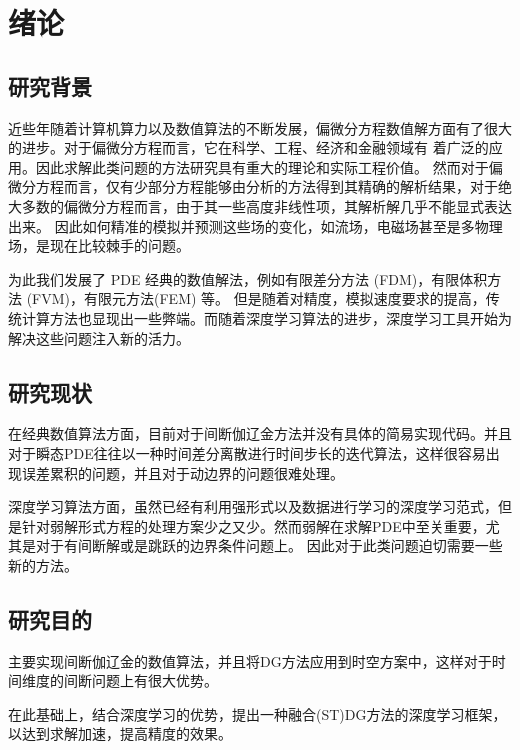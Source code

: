 \cleardoublepage

\chapter{绪论}

\section{研究背景}
近些年随着计算机算力以及数值算法的不断发展，偏微分方程数值解方面有了很大的进步。对于偏微分方程而言，它在科学、工程、经济和金融领域有
着广泛的应用。因此求解此类问题的方法研究具有重大的理论和实际工程价值。
然而对于偏微分方程而言，仅有少部分方程能够由分析的方法得到其精确的解析结果，对于绝大多数的偏微分方程而言，由于其一些高度非线性项，其解析解几乎不能显式表达出来。
因此如何精准的模拟并预测这些场的变化，如流场，电磁场甚至是多物理场，是现在比较棘手的问题。

为此我们发展了 PDE 经典的数值解法，例如有限差分方法 (FDM)，有限体积方法 (FVM)，有限元方法(FEM) 等。
但是随着对精度，模拟速度要求的提高，传统计算方法也显现出一些弊端。而随着深度学习算法的进步，深度学习工具开始为解决这些问题注入新的活力。

\section{研究现状}
在经典数值算法方面，目前对于间断伽辽金方法并没有具体的简易实现代码。并且对于瞬态PDE往往以一种时间差分离散进行时间步长的迭代算法，这样很容易出现误差累积的问题，并且对于动边界的问题很难处理。

深度学习算法方面，虽然已经有利用强形式以及数据进行学习的深度学习范式，但是针对弱解形式方程的处理方案少之又少。然而弱解在求解PDE中至关重要，尤其是对于有间断解或是跳跃的边界条件问题上。
因此对于此类问题迫切需要一些新的方法。

\section{研究目的}
主要实现间断伽辽金的数值算法，并且将DG方法应用到时空方案中，这样对于时间维度的间断问题上有很大优势。

在此基础上，结合深度学习的优势，提出一种融合(ST)DG方法的深度学习框架，以达到求解加速，提高精度的效果。